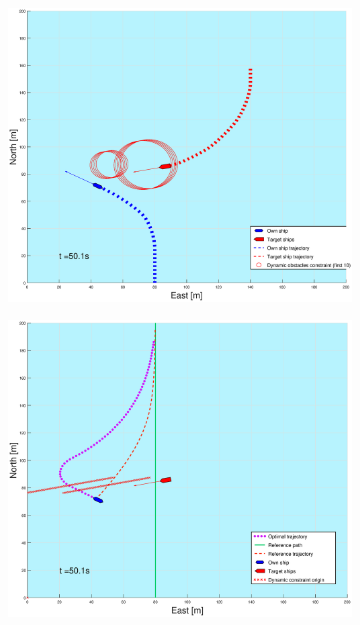 \begin{figure}[!b]
\begin{subfigure}[b]{0.499\textwidth}
    \end{subfigure}
    \hfill
    \\
    \begin{subfigure}[b]{0.49\textwidth}
        \centering
        \includegraphics[width=\textwidth]{Images/Figures/sving_GW/_Simple_1fig1_time=50}
    \end{subfigure}
    \hfill
    \begin{subfigure}[b]{0.499\textwidth}
        \centering
        \includegraphics[width=\textwidth]{Images/Figures/sving_GW/_Simple_1fig999_time=50}
    \end{subfigure}
    \hfill
\end{figure}%
